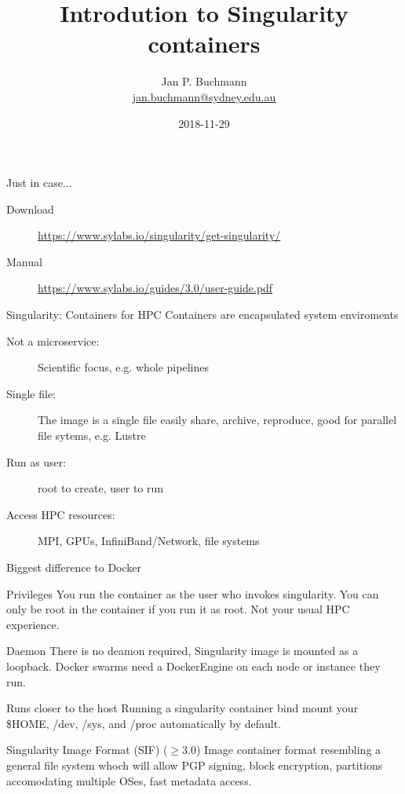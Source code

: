 \documentclass{beamer}
\title[]{Introdution to Singularity containers}
\subtitle{}
\author[]{Jan P. Buchmann\\\small{\href{mailto:jan.buchmann@sydney.edu.au}{jan.buchmann@sydney.edu.au}}}
\institute{The University Of Sydney}
\date{2018-11-29}
\begin{document}
  \titlepage

  \begin{frame}{Just in case...}
    \begin{description}
      \item[Download] \url{https://www.sylabs.io/singularity/get-singularity/}
      \item[Manual] \url{https://www.sylabs.io/guides/3.0/user-guide.pdf}
    \end{description}
  \end{frame}

  \begin{frame}{Singularity: Containers for HPC}
   Containers are encapsulated system enviroments
    \begin{description}
      \item[Not a microservice:]Scientific focus, e.g. whole pipelines
      \item[Single file:] The image is a single file easily share, archive,
                          reproduce, good for parallel file sytems, e.g. Lustre
      \item[Run as user:] root to create, user to run
      \item[Access HPC resources:] MPI, GPUs, InfiniBand/Network, file systems
    \end{description}
  \end{frame}


  \begin{frame}{Biggest difference to Docker}
    \begin{block}{Privileges}
      You run the container as the user who invokes singularity. You can only
      be root in the container if you run it as root. Not your usual HPC
      experience.
    \end{block}
    \begin{block}{Daemon}
      There is no deamon required, Singularity image is mounted as a loopback.
      Docker swarms need a DockerEngine on each  node or instance they run.
    \end{block}
    \begin{block}{Runs closer to the host}
      Running a singularity container bind mount your \$HOME, /dev, /sys, and
      /proc automatically by default.
    \end{block}
    \begin{block}{Singularity Image Format (SIF) ($\geq$3.0)}
      Image container format resembling a general file system whoch will allow
      PGP signing, block encryption, partitions accomodating multiple OSes,
      fast metadata access.
    \end{block}
  \end{frame}
\end{document}
